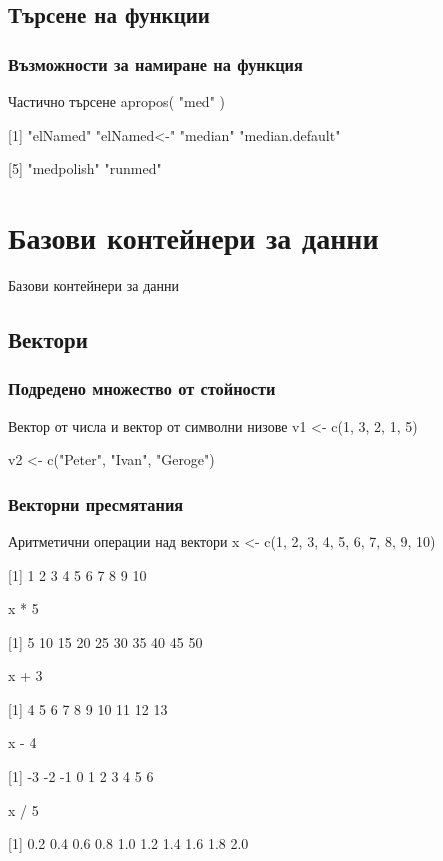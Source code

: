 \documentclass{beamer}
\begin{document}
\subsection{Търсене на функции}

\begin{frame}
\frametitle{Възможности за намиране на функция}
\begin{block}{Частично търсене}
apropos( "med" )

[1] "elNamed"        "elNamed<-"      "median"         "median.default"

[5] "medpolish"      "runmed"
\end{block}
\end{frame}

\section{Базови контейнери за данни}

\begin{frame}
\center \huge{Базови контейнери за данни}
\end{frame}

\subsection{Вектори}

\begin{frame}
\frametitle{Подредено множество от стойности}
\begin{block}{Вектор от числа и вектор от символни низове}
v1 <- c(1, 3, 2, 1, 5)

v2 <- c("Peter", "Ivan", "Geroge")
\end{block}
\end{frame}

\begin{frame}
\frametitle{Векторни пресмятания}
\begin{block}{Аритметични операции над вектори}
x <- c(1, 2, 3, 4, 5, 6, 7, 8, 9, 10)

[1]  1  2  3  4  5  6  7  8  9 10

x * 5

[1]  5 10 15 20 25 30 35 40 45 50

x + 3

[1]  4  5  6  7  8  9 10 11 12 13

x - 4

[1] -3 -2 -1  0  1  2  3  4  5  6

x / 5

[1] 0.2 0.4 0.6 0.8 1.0 1.2 1.4 1.6 1.8 2.0
\end{block}
\end{frame}
\end{document}
